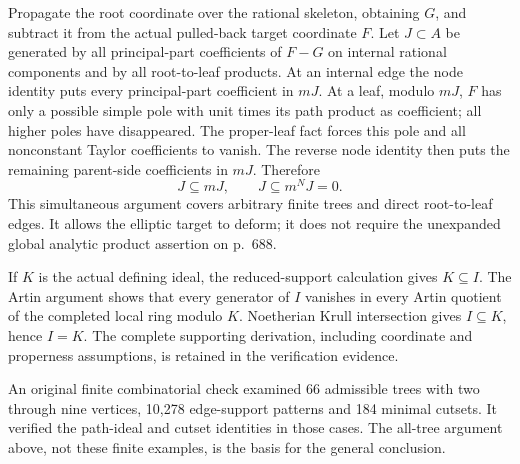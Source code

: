 \documentclass[10pt]{article}
\begin{document}
Propagate the root coordinate over the rational skeleton, obtaining \(G\), and subtract it from the actual pulled-back target coordinate \(F\). Let \(J\subset A\) be generated by all principal-part coefficients of \(F-G\) on internal rational components and by all root-to-leaf products. At an internal edge the node identity puts every principal-part coefficient in \(mJ\). At a leaf, modulo \(mJ\), \(F\) has only a possible simple pole with unit times its path product as coefficient; all higher poles have disappeared. The proper-leaf fact forces this pole and all nonconstant Taylor coefficients to vanish. The reverse node identity then puts the remaining parent-side coefficients in \(mJ\). Therefore \[J\subseteq mJ,
            \qquad J\subseteq m^N J=0.\] This simultaneous argument covers arbitrary finite trees and direct root-to-leaf edges. It allows the elliptic target to deform; it does not require the unexpanded global analytic product assertion on p. 688.\par
If \(K\) is the actual defining ideal, the reduced-support calculation gives \(K\subseteq I\). The Artin argument shows that every generator of \(I\) vanishes in every Artin quotient of the completed local ring modulo \(K\). Noetherian Krull intersection gives \(I\subseteq K\), hence \(I=K\). The complete supporting derivation, including coordinate and properness assumptions, is retained in the verification evidence.\par
An original finite combinatorial check examined 66 admissible trees with two through nine vertices, 10,278 edge-support patterns and 184 minimal cutsets. It verified the path-ideal and cutset identities in those cases. The all-tree argument above, not these finite examples, is the basis for the general conclusion.\par
\end{document}
